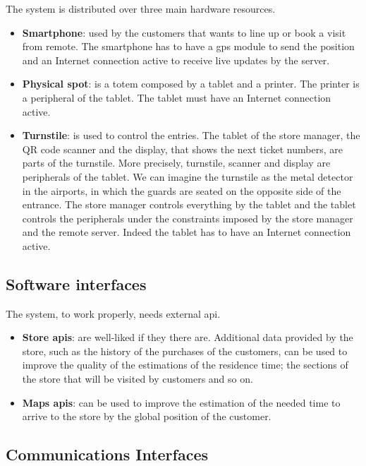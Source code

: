 The system is distributed over three main hardware resources.

\begin{itemize}
	\item \textbf{Smartphone}: used by the customers that wants to line up or book a visit from remote. The smartphone has to have a \gls{gps} module to send the position and an Internet connection active to receive live updates by the server.
	\item \textbf{Physical spot}: is a totem composed by a tablet and a printer. The printer is a peripheral of the tablet. The tablet must have an Internet connection active.
	\item \textbf{Turnstile}: is used to control the entries. The tablet of the store manager, the QR code scanner and the display, that shows the next ticket numbers, are parts of the turnstile. More precisely, turnstile, scanner and display are peripherals of the tablet.
	We can imagine the turnstile as the metal detector in the airports, in which the guards are seated on the opposite side of the entrance.
	The store manager controls everything by the tablet and the tablet controls the peripherals under the constraints imposed by the store manager and the remote server.
	Indeed the tablet has to have an Internet connection active.
\end{itemize}

\subsection{Software interfaces}

The system, to work properly, needs external \gls{api}.

\begin{itemize}
	\item \textbf{Store \glspl{api}}: are well-liked if they there are. Additional data provided by the store, such as the history of the purchases of the customers, can be used to improve the quality of the estimations of the residence time; the sections of the store that will be visited by customers and so on.
	\item \textbf{Maps \glspl{api}}: can be used to improve the estimation of the needed time to arrive to the store by the global position of the customer.
\end{itemize}

\subsection{Communications Interfaces}

